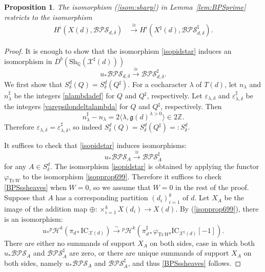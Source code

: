 \documentclass [11pt,oneside,a4paper,mathscr]{amsart}
\newtheorem{prop}[thm]{Proposition}
\theoremstyle{definition}
\newcommand{\X}{\mathscr{X}}
\begin{document}
\begin{prop}\label{BPSprime}
The isomorphism (\ref{isom:sharp}) in Lemma~\ref{lem:BPSprime}
restricts to the isomorphism 
    \begin{align*}
    H^i(X(d), \mathcal{BPS}_{d,\delta})&\stackrel{\cong}{\to}  H^i(X^\sharp(d), \mathcal{BPS}^\sharp_{d,\delta}).
\end{align*}
\end{prop}
\begin{proof}
      It is enough to show that the isomorphism \eqref{isopidstar} induces an isomorphism in $D^b(\mathrm{Sh}_{\mathbb{Q}}(\X^\sharp(d)))$
    \[u_*\mathcal{BPS}_{d,\delta}\xrightarrow{\cong} \mathcal{BPS}^\sharp_{d,\delta}.\]
   We first show that $S^d_\delta(Q)=S^d_\delta(Q^\sharp)$.
   For a cocharacter $\lambda$ of $T(d)$, let $n_\lambda$ and $n^\sharp_\lambda$ be the integers \eqref{nlambdadef} for $Q$ and $Q^\sharp$, respectively. Let $\varepsilon_{\lambda, \delta}$ and $\varepsilon_{\lambda, \delta}^\sharp$ be the integers \eqref{varepsilondeltalambda} for $Q$ and $Q^\sharp$, respectively.
Then
\[n^\sharp_\lambda-n_\lambda=2\langle \lambda, \mathfrak{g}(d)^{\lambda>0}\rangle \in 2\mathbb{Z}.\]
Therefore $\varepsilon_{\lambda, \delta}=\varepsilon_{\lambda, \delta}^\sharp$, so indeed $S^d_\delta(Q)=S^d_\delta(Q^\sharp)=:S^d_\delta$. 
    
    It suffices to check that \eqref{isopidstar} induces isomorphisms:
    \begin{equation}\label{BPSssheaves}
    u_*\mathcal{BPS}_A\xrightarrow{\cong}\mathcal{BPS}^\sharp_A
     \end{equation} for any $A\in S^d_\delta$.     
     The isomorphism \eqref{isopidstar} is obtained by applying the functor $\varphi_{\mathrm{Tr}\,W}$ to the isomorphism \eqref{isopprop699}. 
     Therefore it suffices to check \eqref{BPSssheaves} when $W=0$, so we assume that $W=0$ in the rest of the proof.
    Suppose that $A$ has a corresponding partition $(d_i)_{i=1}^k$ of $d$. Let $X_A$ be the image of the addition map $\oplus\colon \times_{i=1}^k X(d_i)\to X(d)$. 
    By (\ref{isopprop699}), there is an isomorphism:
    \[u_*{}^p\mathcal{H}^{k}(\pi_{d*}\mathrm{IC}_{\X(d)})\xrightarrow{\sim} {}^p\mathcal{H}^{k}(\pi^\sharp_{d*}\varphi_{\mathrm{Tr}\,W^q}\mathrm{IC}_{\X^\sharp(d)}[-1]).\]
    There are either no summands of support $X_A$ on both sides, case in which both $u_*\mathcal{BPS}_A$ and $\mathcal{BPS}^\sharp_A$ are zero, or there are unique summands of support $X_A$ on both sides, namely $u_*\mathcal{BPS}_A$ and $\mathcal{BPS}^\sharp_A$, and thus \eqref{BPSssheaves} follows.
\end{proof}
\end{document}
